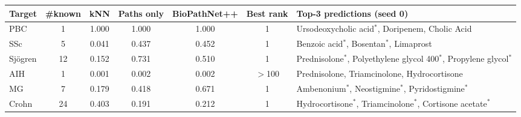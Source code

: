 \begin{tabular}{lcccccl}
\toprule
Target & \#known & kNN & Paths only & BioPathNet++ & Best rank & Top-3 predictions (seed 0)\\
\midrule
PBC & 1 & 1.000 & 1.000 & 1.000 & 1 & Ursodeoxycholic acid$^{*}$, Doripenem, Cholic Acid\\
SSc & 5 & 0.041 & 0.437 & 0.452 & 1 & Benzoic acid$^{*}$, Bosentan$^{*}$, Limaprost\\
Sj\"ogren & 12 & 0.152 & 0.731 & 0.510 & 1 & Prednisolone$^{*}$, Polyethylene glycol 400$^{*}$, Propylene glycol$^{*}$\\
AIH & 1 & 0.001 & 0.002 & 0.002 & $>$100 & Prednisolone, Triamcinolone, Hydrocortisone\\
MG & 7 & 0.179 & 0.418 & 0.671 & 1 & Ambenonium$^{*}$, Neostigmine$^{*}$, Pyridostigmine$^{*}$\\
Crohn & 24 & 0.403 & 0.191 & 0.212 & 1 & Hydrocortisone$^{*}$, Triamcinolone$^{*}$, Cortisone acetate$^{*}$\\
\bottomrule
\end{tabular}
